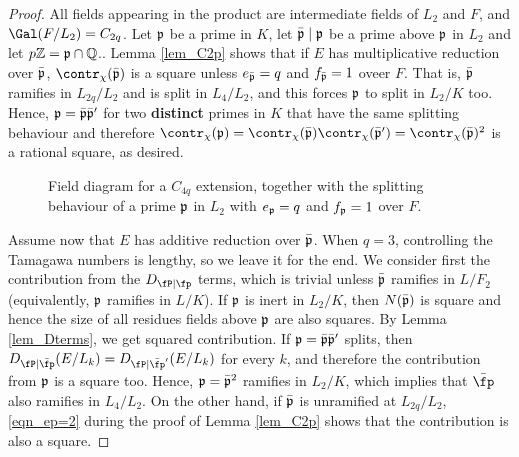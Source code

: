 \begin{proof}
    All fields appearing in the product are intermediate fields of $L_2$ and $F$, and $\Gal(F/L_2)=C_{2q}$. Let $\mathfrak{p}$ be a prime in $K$, let $\bar{\mathfrak{p}}\mid\mathfrak{p}$ be a prime above $\mathfrak{p}$ in $L_2$ and let $p\mathbb{Z}=\mathfrak{p}\cap\mathbb{Q}$.. Lemma \ref{lem_C2p} shows that if $E$ has multiplicative reduction over $\bar{\mathfrak{p}}$, $\contr_\chi(\bar\pp)$ is a square unless $e_{\bar{\mathfrak{p}}}=q$ and $f_{\bar{\mathfrak{p}}}=1$ oveer $F$. That is, $\bar{\mathfrak{p}}$ ramifies in $L_{2q}/L_2$ and is split in $L_4/L_2$, and this forces $\mathfrak{p}$ to split in $L_2/K$ too. Hence, $\mathfrak{p}=\bar{\mathfrak{p}}\bar{\mathfrak{p}}'$ for two \textbf{distinct} primes in $K$ that have the same splitting behaviour and therefore $\contr_\chi(\pp)=\contr_\chi(\bar\pp)\contr_\chi(\bar\pp')=\contr_\chi(\bar\pp)^2$ is a rational square, as desired.

    \begin{figure}[!ht]
        \centering
        \caption[short]{\centering Field diagram for a $C_{4q}$ extension, together with the splitting \newline behaviour of a prime $\mathfrak{p}$ in $L_2$ with $e_{\mathfrak{p}}=q$ and $f_{\mathfrak{p}}=1$ over $F$.}
    \end{figure}

    Assume now that $E$ has additive reduction over $\bar{\mathfrak{p}}$. When $q=3$, controlling the Tamagawa numbers is lengthy, so we leave it for the end. We consider first the contribution from the $D_{\fP\mid\fp}$ terms, which is trivial unless $\bar{\mathfrak{p}}$ ramifies in $L/F_2$ (equivalently, $\mathfrak{p}$ ramifies in $L/K$). If $\mathfrak{p}$ is inert in $L_2/K$, then $N(\bar{\mathfrak{p}})$ is square and hence the size of all residues fields above $\mathfrak{p}$ are also squares. By Lemma \ref{lem_Dterms}, we get squared contribution. If $\mathfrak{p}=\bar{\mathfrak{p}}\bar{\mathfrak{p}}'$ splits, then $D_{\fP\mid\bar\fp}(E/L_k)=D_{\fP\mid\bar\fp'}(E/L_k)$ for every $k$, and therefore the contribution from $\mathfrak{p}$ is a square too. Hence, $\mathfrak{p}=\bar{\mathfrak{p}}^2$ ramifies in $L_2/K$, which implies that $\bar\fp$ also ramifies in $L_4/L_2$. On the other hand, if $\bar{\mathfrak{p}}$ is unramified at $L_{2q}/L_2$, \eqref{eqn_ep=2} during the proof of Lemma \ref{lem_C2p} shows that the contribution is also a square. 


\end{proof}
